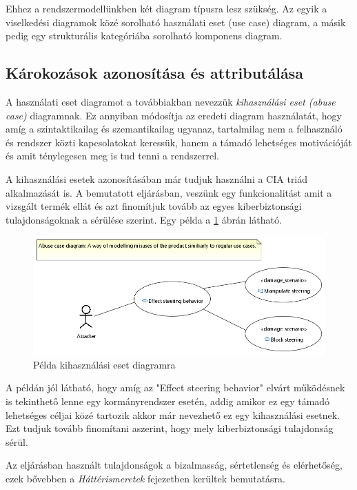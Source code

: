 Ehhez a rendszermodellünkben két diagram típusra lesz szükség. Az egyik a viselkedési diagramok közé sorolható használati eset (use case) diagram, a másik pedig egy strukturális kategóriába sorolható komponens diagram.\\

\subsection{Károkozások azonosítása és attributálása}

A használati eset diagramot a továbbiakban nevezzük \textit{kihasználási eset (abuse case)} diagramnak. Ez annyiban módosítja az eredeti diagram használatát, hogy amíg a szintaktikailag és szemantikailag ugyanaz, tartalmilag nem a felhasználó és rendszer közti kapcsolatokat keressük, hanem a támadó lehetséges motivációját és amit ténylegesen meg is tud tenni a rendszerrel. 

A kihasználási esetek azonosításában már tudjuk használni a CIA triád alkalmazását is. A bemutatott eljárásban, veszünk egy funkcionalitást amit a vizsgált termék ellát és azt finomítjuk tovább az egyes kiberbiztonsági tulajdonságoknak a sérülése szerint. Egy példa a \ref{fig:04_abuse_case} ábrán látható.

\begin{figure}[!ht]
	\centering
	\includegraphics[width=130mm, keepaspectratio]{figures/04_abuse_case.png}
	\caption{Példa kihasználási eset diagramra}
	\label{fig:04_abuse_case}
\end{figure}

A példán jól látható, hogy amíg az "Effect steering behavior" elvárt működésnek is tekinthető lenne egy kormányrendszer esetén, addig amikor ez egy támadó lehetséges céljai közé tartozik akkor már nevezhető ez egy kihasználási esetnek. Ezt tudjuk tovább finomítani aszerint, hogy mely kiberbiztonsági tulajdonság sérül. 

Az eljárásban használt tulajdonságok a bizalmasság, sértetlenség és elérhetőség, ezek bővebben a \textit{Háttérismeretek} fejezetben kerültek bemutatásra. 

